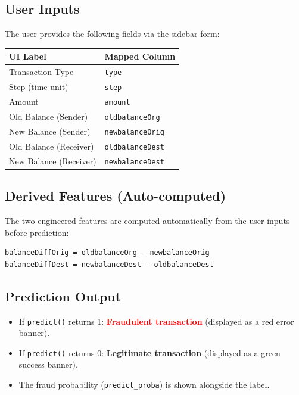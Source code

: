 \documentclass[12pt, a4paper]{article}
\begin{document}
\subsection{User Inputs}

The user provides the following fields via the sidebar form:

\begin{center}
\begin{tabular}{ll}
\toprule
\textbf{UI Label} & \textbf{Mapped Column} \\
\midrule
Transaction Type     & \texttt{type} \\
Step (time unit)     & \texttt{step} \\
Amount               & \texttt{amount} \\
Old Balance (Sender) & \texttt{oldbalanceOrg} \\
New Balance (Sender) & \texttt{newbalanceOrig} \\
Old Balance (Receiver) & \texttt{oldbalanceDest} \\
New Balance (Receiver) & \texttt{newbalanceDest} \\
\bottomrule
\end{tabular}
\end{center}

\subsection{Derived Features (Auto-computed)}

The two engineered features are computed automatically from the user inputs before prediction:

\begin{lstlisting}
balanceDiffOrig = oldbalanceOrg - newbalanceOrig
balanceDiffDest = newbalanceDest - oldbalanceDest
\end{lstlisting}

\subsection{Prediction Output}

\begin{itemize}
    \item If \texttt{predict()} returns 1: \textcolor{red}{\textbf{Fraudulent transaction}} (displayed as a red error banner).
    \item If \texttt{predict()} returns 0: \textcolor{green!60!black}{\textbf{Legitimate transaction}} (displayed as a green success banner).
    \item The fraud probability (\texttt{predict\_proba}) is shown alongside the label.
\end{itemize}
\end{document}

